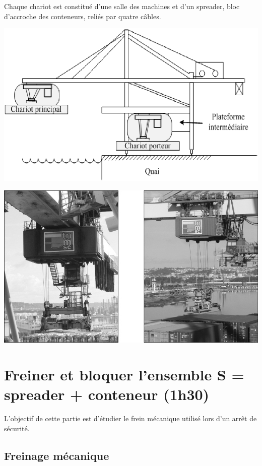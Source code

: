 Chaque chariot est constitué d'une salle des machines et d'un spreader, bloc d'accroche des conteneurs, reliés par quatre câbles.

\begin{center}
 \includegraphics[width=0.5\linewidth]{img/fig2}
\end{center}

\begin{center}
 \includegraphics[width=0.5\linewidth]{img/fig3}
\end{center}


\section{Freiner et bloquer l'ensemble S = {spreader + conteneur} (1h30)}

L'objectif de cette partie est d'étudier le frein mécanique utilisé lors d'un arrêt de sécurité.

\subsection{Freinage mécanique}

